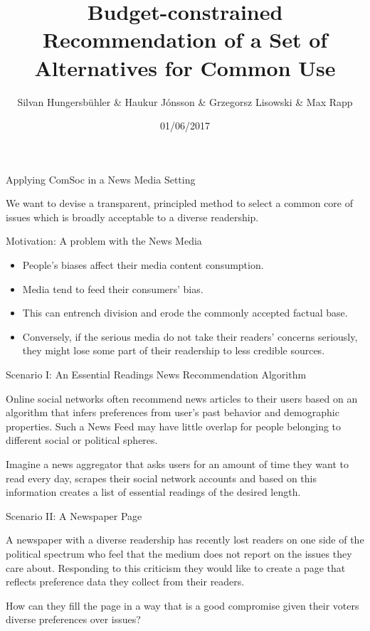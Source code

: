 \documentclass{beamer}
\title{Budget-constrained Recommendation of a Set of Alternatives for Common Use}
\author{Silvan Hungersb\"{u}hler \& Haukur J\'{o}nsson \& Grzegorsz Lisowski \& Max Rapp}
\date{01/06/2017}
\begin{document}
	
\begin{frame}
	\titlepage
\end{frame}

\begin{frame}{Applying ComSoc in a News Media Setting}

We want to devise a transparent, principled method to select a common core of issues which is broadly acceptable to a diverse readership.

\end{frame}

\begin{frame}{Motivation: A problem with the News Media}

\begin{itemize}
\item People's biases affect their media content consumption.
\item Media tend to feed their consumers' bias.
\item This can entrench division and erode the commonly accepted factual base.
\item Conversely, if the serious media do not take their readers' concerns seriously, they might lose some part of their readership to less credible sources.

\end{itemize}
	
\end{frame}

\begin{frame}{Scenario I: An Essential Readings News Recommendation Algorithm}
	
	Online social networks often recommend news articles to their users based on an algorithm that infers preferences from user's past behavior and demographic properties. Such a News Feed may have little overlap for people belonging to different social or political spheres.

	\vspace{5mm}

	Imagine a news aggregator that asks users for an amount of time they want to read every day, scrapes their social network accounts and based on this information creates a list of essential readings of the desired length.
		
\end{frame}

\begin{frame}{Scenario II: A  Newspaper Page}
	
	A newspaper with a diverse readership has recently lost readers on one side of the political spectrum who feel that the medium does not report on the issues they care about. Responding to this criticism they would like to create a page that reflects preference data they collect from their readers.

	\vspace{5mm}

	How can they fill the page in a way that is a good compromise given their voters diverse preferences over issues?
	
\end{frame}
\end{document}
